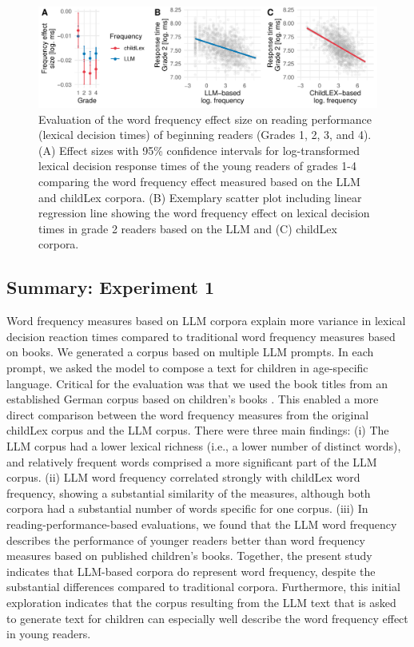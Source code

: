 \documentclass[doc, a4paper]{apa7}
\begin{document}
\begin{figure}[!htbp]
    \centering
    \includegraphics[scale=.8]{figures/exp1_ef_size.pdf}
    \caption{Evaluation of the word frequency effect size on reading performance (lexical decision times) of beginning readers (Grades 1, 2, 3, and 4). (A) Effect sizes with 95\% confidence intervals for log-transformed lexical decision response times of the young readers of grades 1-4 comparing the word frequency effect measured based on the LLM and childLex corpora. (B) Exemplary scatter plot including linear regression line showing the word frequency effect on lexical decision times in grade 2 readers based on the LLM and (C) childLex corpora.}
\label{fig:ef_size}
\end{figure}


\subsection{Summary: Experiment 1}

Word frequency measures based on LLM corpora explain more variance in lexical decision reaction times compared to traditional word frequency measures based on books. We generated a corpus based on multiple LLM prompts. In each prompt, we asked the model to compose a text for children in age-specific language. Critical for the evaluation was that we used the book titles from an established German corpus based on children's books \citep[childLex; ][]{schroeder_childlex_2015}. This enabled a more direct comparison between the word frequency measures from the original childLex corpus and the LLM corpus. There were three main findings: (i) The LLM corpus had a lower lexical richness (i.e., a lower number of distinct words), and relatively frequent words comprised a more significant part of the LLM corpus. (ii) LLM word frequency correlated strongly with childLex word frequency, showing a substantial similarity of the measures, although both corpora had a substantial number of words specific for one corpus. (iii) In reading-performance-based evaluations, we found that the LLM word frequency describes the performance of younger readers better than word frequency measures based on published children's books. Together, the present study indicates that LLM-based corpora do represent word frequency, despite the substantial differences compared to traditional corpora. Furthermore, this initial exploration indicates that the corpus resulting from the LLM text that is asked to generate text for children can especially well describe the word frequency effect in young readers.  
\end{document}
